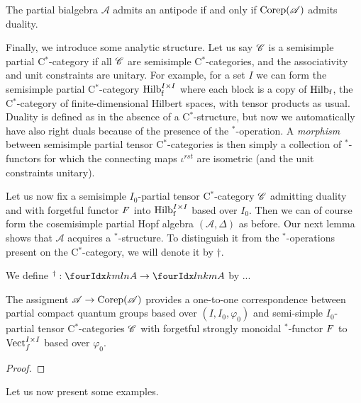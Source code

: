 \begin{Prop} The partial bialgebra $\mathscr{A}$ admits an antipode if and only if $\mathrm{Corep}(\mathscr{A})$ admits duality.
\end{Prop} 

Finally, we introduce some analytic structure. Let us say $\mathscr{C}$ is a semisimple partial C$^*$-category if all $\mathscr{C}$ are semisimple C$^*$-categories, and the associativity and unit constraints are unitary. For example, for a set $I$ we can form the semisimple partial C$^*$-category $\mathrm{Hilb}_{\operatorname{\mathrm{f}}}^{I\times I}$ where each block is a copy of $\mathrm{Hilb}_{\operatorname{\mathrm{f}}}$, the C$^*$-category of finite-dimensional Hilbert spaces, with tensor products as usual. Duality is defined as in the absence of a C$^*$-structure, but now we automatically have also right duals because of the presence of the $^*$-operation. A \emph{morphism} between semisimple partial tensor C$^*$-categories is then simply a collection of $^*$-functors for which the connecting maps $\iota^{rst}$ are isometric (and the unit constraints unitary). 

Let us now fix a semisimple $I_0$-partial tensor C$^*$-category $\mathscr{C}$ admitting duality and with forgetful functor $F$ into $\mathrm{Hilb}_{\operatorname{\mathrm{f}}}^{I\times I}$ based over $I_0$. Then we can of course form the cosemisimple partial Hopf algebra $(\mathscr{A},\Delta)$ as before. Our next lemma shows that $\mathscr{A}$ acquires a $^*$-structure. To distinguish it from the $^*$-operations present on the C$^*$-category, we will denote it by $\dagger$.

\begin{Def} We define $^\dag: \Gr{A}{k}{l}{m}{n}\rightarrow \Gr{A}{l}{k}{n}{m}$ by ...

\end{Def}

\begin{Theorem} \label{TheoTKPCQG} The assigment $\mathscr{A}\rightarrow \mathrm{Corep}(\mathscr{A})$ provides a one-to-one correspondence between partial compact quantum groups based over $(I,I_0,\varphi_0)$ %
and semi-simple $I_0$-partial tensor C$^*$-categories $\mathscr{C}$ with forgetful strongly monoidal $^*$-functor $F$ to $\mathrm{Vect}_f^{I\times I}$ based over $\varphi_0$. %
\end{Theorem} 

\begin{proof}

\end{proof}


Let us now present some examples.

